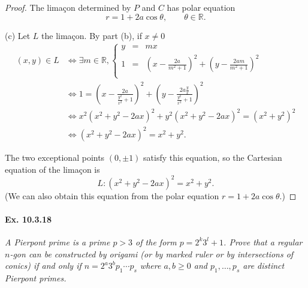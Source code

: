 \documentclass[11pt,a4paper]{article}
\newcommand{\R}{\mathbb{R}}
\begin{document}
\begin{proof}
The lima\c con determined by $P$ and $C$ has polar equation
$$r = 1 + 2a \cos \theta, \qquad \theta \in \R.$$

\item[(c)] Let $L$ the lima\c con. By part (b), if $x \ne 0$
\begin{align*}
(x,y) \in L &\iff \exists m \in \R, 
\left\{
\begin{array}{ccl}
 y & =   & mx  \\
 1 & =  &   \left(x - \frac{2a}{m^2 + 1}\right)^2 + \left(y - \frac{2am}{m^2+1}\right)^2 \\
\end{array}
\right.\\
 &\iff 1  =    \left(x - \frac{2a}{\frac{y^2}{x^2} + 1}\right)^2 + \left(y - \frac{2a\frac{y}{x}}{\frac{y^2}{x^2}+1}\right)^2 \\
 &\iff x^2(x^2+y^2-2ax)^2 + y^2 (x^2+y^2-2ax)^2 = (x^2+y^2)^2\\
 &\iff (x^2 + y^2 -2ax)^2 = x^2+y^2.
\end{align*}

The two exceptional points $(0,\pm1)$ satisfy this equation, so the Cartesian equation of the lima\c con is
$$L : (x^2 + y^2 -2ax)^2 = x^2+y^2.$$
(We can also obtain this equation from the polar equation $r = 1 + 2a \cos \theta$.)
\end{proof}

\paragraph{Ex. 10.3.18}

{\it A Pierpont prime is a prime $p>3$ of the form $p=2^k 3^l+1$. Prove that a regular $n$-gon can be constructed by origami (or by marked ruler or by intersections of conics) if and only if $n = 2^a 3^b p_1 \cdots p_s$ where $a,b\geq 0$ and $p_1,\ldots,p_s$ are distinct Pierpont primes. 
}
\end{document}
